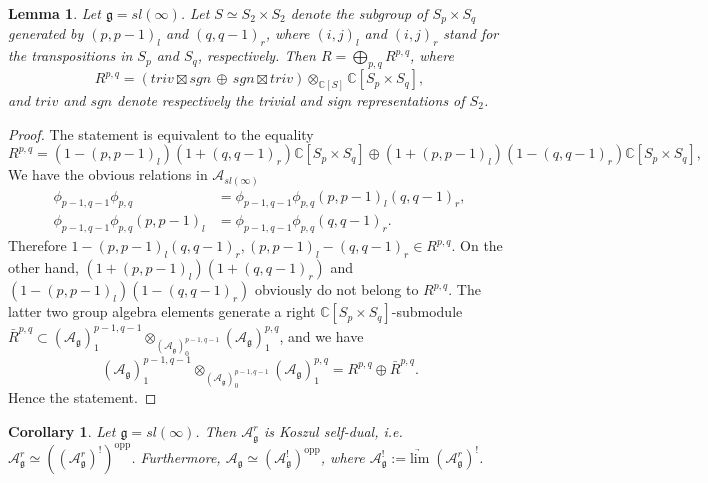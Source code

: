 \documentclass{amsart}
\renewcommand{\sl}{sl}
\renewcommand{\gg}{\mathfrak{g}}
\newcommand{\limarr}{\underrightarrow{\mathrm{lim}} \;}
\newtheorem{lemma}[thm]{Lemma}
\newtheorem{cor}[thm]{Corollary}
\theoremstyle{definition}
\numberwithin{equation}{section}
\begin{document}
\begin{lemma}  \label{bardef}
Let  $\gg=\sl(\infty)$.  Let $S \simeq S_2\times S_2$ denote the subgroup of $S_p \times S_q$ generated by $(p,p-1)_l$ and
$(q,q-1)_r$, where $(i,j)_l$ and $(i,j)_r$ stand for the transpositions in $S_p$ and $S_q$, respectively. 
Then $R=\bigoplus_{p,q} R^{p,q}$, where 
$$ R^{p,q}=(triv\boxtimes sgn \, \oplus \, sgn\boxtimes triv)\otimes_{\mathbb C[S]}\mathbb C[S_p\times  S_q],$$
and $triv$ and $sgn$ denote respectively the trivial and sign representations of $S_2$.
\end{lemma}
\begin{proof} The statement is equivalent to the equality
$$ R^{p,q}=(1-(p,p-1)_l)(1+(q,q-1)_r)\mathbb C[S_p\times  S_q]\oplus (1+(p,p-1)_l)(1-(q,q-1)_r)\mathbb C[S_p\times  S_q],$$
We have the obvious relations in $\mathcal A_{\sl(\infty)}$
\begin{align*}
\phi_{p-1,q-1}\phi_{p,q}&=\phi_{p-1,q-1}\phi_{p,q}(p,p-1)_l(q,q-1)_r, \\
\phi_{p-1,q-1}\phi_{p,q}(p,p-1)_l&=\phi_{p-1,q-1}\phi_{p,q}(q,q-1)_r.
\end{align*} 
Therefore $1-(p,p-1)_l(q,q-1)_r, (p,p-1)_l-(q,q-1)_r\in R^{p,q}$.
On the other hand, $(1+(p,p-1)_l)(1+(q,q-1)_r)$ and
$(1-(p,p-1)_l)(1-(q,q-1)_r)$ obviously do not belong to $R^{p,q}$. The latter two group algebra elements
generate a right $\mathbb C[S_p\times S_q]$-submodule $\bar R^{p,q} \subset (\mathcal A_\gg)^{p-1,q-1}_1\otimes_{(\mathcal
  A_\gg)^{p-1,q-1}_0}(\mathcal A_\gg)^{p,q}_1$,
and we have 
$$(\mathcal A_\gg)^{p-1,q-1}_1\otimes_{(\mathcal
  A_\gg)^{p-1,q-1}_0}(\mathcal A_\gg)^{p,q}_1=R^{p,q}\oplus \bar R^{p,q}.$$
Hence the statement.
\end{proof}


\begin{cor}\label{selfduality}  
Let  $\gg=\sl(\infty)$. Then $\mathcal A^r_\gg$ is Koszul self-dual, i.e.\  $\mathcal A^r_\gg\simeq  ((\mathcal A^r_\gg)^!)^\mathrm{opp}$.  Furthermore, $\mathcal A_\gg\simeq  (\mathcal A_\gg^!)^\mathrm{opp}$, where $\mathcal A_\gg^! := \limarr (\mathcal A^r_\gg)^!$.
\end{cor}
\end{document}
